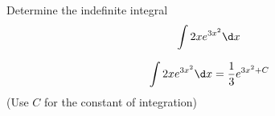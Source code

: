 \documentclass{ximera}
\author{Jason Miller}
\begin{document}
\begin{exercise}
Determine the indefinite integral
\[
\int 2xe^{3x^{2}} \d  x 
\]



\[
\int 2xe^{3x^{2}} \d x=\frac{1}{3}e^{3x^{2} +C}
\]
(Use $C$ for the constant of integration)

\end{exercise}
\end{document}
